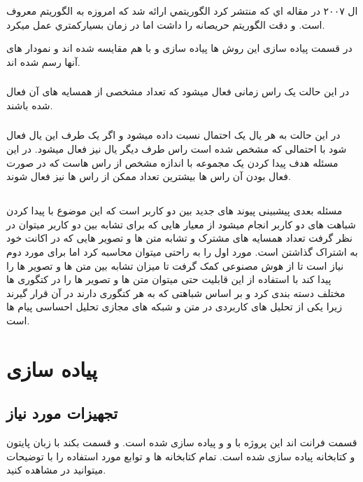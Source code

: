 \documentclass[12pt]{article}
\begin{document}
ال ۲۰۰۷ در مقاله اي كه 
 منتشر كرد الگوريتمي ارائه شد كه امروزه به الگوريتم 
معروف است. و دقت الگوريتم حريصانه را داشت اما در زمان بسياركمتري عمل ميكرد.
\cite{celf}

 در قسمت پياده 
سازی اين روش ها پياده سازی و با هم مقايسه شده اند و نمودار های آنها رسم شده اند.


\subsubsection{}
 در اين حالت يک راس زمانی فعال ميشود که تعداد مشخصی از همسايه 
های آن فعال شده باشند.


\subsubsection{}
در اين حالت به هر يال يک احتمال نسبت داده ميشود و اگر يک 
طرف اين يال فعال شود با احتمالی که مشخص شده است راس طرف ديگر يال نيز فعال ميشود.
در اين مسئله هدف پيدا کردن يک مجموعه با اندازه مشخص از راس هاست که در صورت فعال بودن آن 
راس ها بيشترين تعداد ممکن از راس ها نيز فعال شوند.


\subsection{}

مسئله بعدی پيشبينی پيوند های جديد بين دو کاربر است که اين موضوع با پيدا کردن شباهت های دو 
کاربر انجام ميشود از معيار هايی که برای تشابه بين دو کاربر ميتوان در نظر گرفت تعداد همسايه های 
مشترک و تشابه متن ها و تصوير هايی که در اکانت خود به اشتراک گذاشتن است.
مورد اول را به راحتی ميتوان محاسبه کرد اما برای مورد دوم نياز است تا از هوش مصنوعی کمک 
گرفت تا ميزان تشابه بين متن ها و تصوير ها را پيدا کند با استفاده از اين قابليت حتی ميتوان متن ها و 
تصوير ها را در کتگوری ها مختلف دسته بندی کرد و بر اساس شباهتی که به هر کتگوری دارند در آن 
قرار گيرند زيرا يکی از تحليل های کاربردی در متن و شبکه های مجازی تحليل احساسی پيام ها است. 

\section{پیاده سازی}
\subsection{تجهیزات مورد نیاز}
قسمت فرانت اند این پروژه با
و
و
پیاده سازی شده است. و قسمت بکند با زبان پایتون و کتابخانه
پیاده سازی شده است. 
تمام کتابخانه ها و توابع مورد استفاده را با توضیحات میتوانید در 
 مشاهده کنید.
\end{document}
